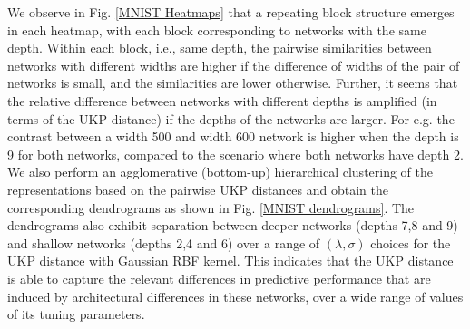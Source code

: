 \documentclass{article}
\theoremstyle{plain}
\newcommand{\metricstname}{UKP }
\begin{document}
We observe in Fig. \ref{MNIST Heatmaps} that a repeating block structure emerges in each heatmap, with each block corresponding to networks with the same depth. Within each block, i.e., same depth, the pairwise similarities between networks with different widths are higher if the difference of widths of the pair of networks is small, and the similarities are lower otherwise. Further, it seems that the relative difference between networks with different depths is amplified (in terms of the \metricstname distance) if the depths of the networks are larger. For e.g. the contrast between a width 500 and width 600 network is higher when the depth is 9 for both networks, compared to the scenario where both networks have depth 2. We also perform an agglomerative (bottom-up) hierarchical clustering of the representations based on the pairwise \metricstname distances and obtain the corresponding dendrograms as shown in Fig. \ref{MNIST dendrograms}. The dendrograms also exhibit separation between deeper networks (depths 7,8 and 9) and shallow networks (depths 2,4 and 6) over a range of $(\lambda,\sigma)$ choices for the \metricstname distance with Gaussian RBF kernel. This indicates that the \metricstname distance is able to capture the relevant differences in predictive performance that are induced by architectural differences in these networks, over a wide range of values of its tuning parameters.
\end{document}
